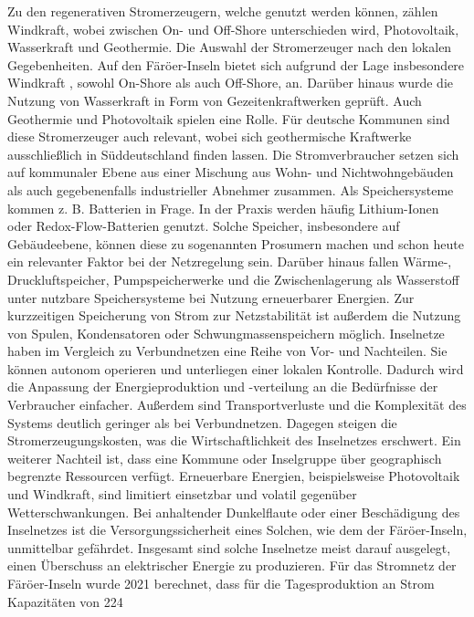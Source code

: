 Zu den regenerativen Stromerzeugern, welche genutzt werden können, zählen Windkraft, wobei zwischen On- und Off-Shore unterschieden wird, 
Photovoltaik, Wasserkraft und Geothermie. Die Auswahl der Stromerzeuger nach den lokalen Gegebenheiten. 
Auf den Färöer-Inseln bietet sich aufgrund der Lage insbesondere Windkraft , sowohl On-Shore als auch Off-Shore, an. 
Darüber hinaus wurde die Nutzung von Wasserkraft in Form von Gezeitenkraftwerken geprüft\cite{trondheim-thesis}. 
Auch Geothermie und Photovoltaik spielen eine Rolle. Für deutsche Kommunen sind diese Stromerzeuger auch relevant, wobei sich 
geothermische Kraftwerke ausschließlich in Süddeutschland finden lassen. 
Die Stromverbraucher setzen sich auf kommunaler Ebene aus einer Mischung aus Wohn- und Nichtwohngebäuden als auch gegebenenfalls industrieller Abnehmer zusammen. 
Als Speichersysteme kommen z. B. Batterien in Frage. In der Praxis werden häufig Lithium-Ionen oder Redox-Flow-Batterien genutzt. 
Solche Speicher, insbesondere auf Gebäudeebene, können diese zu sogenannten Prosumern  machen und schon heute ein relevanter Faktor bei der Netzregelung sein. 
Darüber hinaus fallen Wärme-, Druckluftspeicher, Pumpspeicherwerke und die Zwischenlagerung als Wasserstoff unter nutzbare Speichersysteme bei Nutzung erneuerbarer Energien. 
Zur kurzzeitigen Speicherung von Strom zur Netzstabilität ist außerdem die Nutzung von Spulen, Kondensatoren oder Schwungmassenspeichern möglich. 
Inselnetze haben im Vergleich zu Verbundnetzen eine Reihe von Vor- und Nachteilen. 
Sie können autonom operieren und unterliegen einer lokalen Kontrolle. 
Dadurch wird die Anpassung der Energieproduktion und -verteilung an die Bedürfnisse der Verbraucher einfacher. 
Außerdem sind Transportverluste und die Komplexität des Systems deutlich geringer als bei Verbundnetzen. 
Dagegen steigen die Stromerzeugungskosten, was die Wirtschaftlichkeit des Inselnetzes erschwert. 
Ein weiterer Nachteil ist, dass eine Kommune oder Inselgruppe über geographisch begrenzte Ressourcen verfügt. 
Erneuerbare Energien, beispielsweise Photovoltaik und Windkraft, sind limitiert einsetzbar und volatil gegenüber Wetterschwankungen. 
Bei anhaltender Dunkelflaute oder einer Beschädigung des Inselnetzes ist die Versorgungssicherheit eines Solchen, wie dem der Färöer-Inseln, unmittelbar gefährdet.
Insgesamt sind solche Inselnetze meist darauf ausgelegt, einen Überschuss an elektrischer Energie zu produzieren. 
Für das Stromnetz der Färöer-Inseln wurde 2021 berechnet, dass für die Tagesproduktion an Strom Kapazitäten von 224%
 

